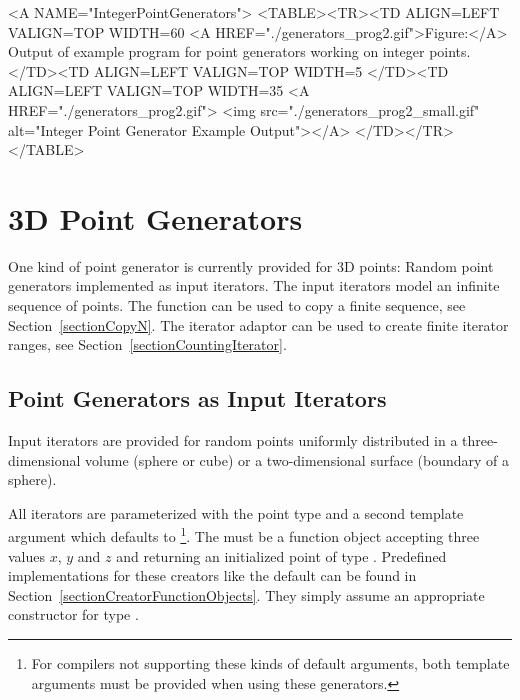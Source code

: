 
\begin{ccHtmlOnly}
  <A NAME="IntegerPointGenerators">
  <TABLE><TR><TD ALIGN=LEFT VALIGN=TOP WIDTH=60%
    <A HREF="./generators_prog2.gif">Figure:</A>
        Output of example program for point generators working
        on integer points.
  </TD><TD ALIGN=LEFT VALIGN=TOP WIDTH=5%
  </TD><TD ALIGN=LEFT VALIGN=TOP WIDTH=35%
    <A HREF="./generators_prog2.gif">
        <img src="./generators_prog2_small.gif" 
             alt="Integer Point Generator Example Output"></A>
  </TD></TR></TABLE>
\end{ccHtmlOnly}%


\newpage
\section{3D Point Generators}
\label{sectionPointGenerators_3}

One kind of point generator is currently provided for 3D points: Random point
generators implemented as input iterators.  The input iterators model
an infinite sequence of points. The function  can
be used to copy a finite sequence, see Section~\ref{sectionCopyN}. The
iterator adaptor  can be used to create
finite iterator ranges, see Section~\ref{sectionCountingIterator}.


\subsection{Point Generators as Input Iterators}

\ccDefinition

Input iterators are provided for random points uniformly distributed
in a three-dimensional volume (sphere or cube) or a two-dimensional
surface (boundary of a sphere).

All iterators are parameterized with the point type  and a second
template argument  which defaults to
\footnote{%
  For compilers not supporting these kinds of default arguments, both
  template arguments must be provided when using these generators.}.
The  must be a function object accepting three
 values $x$, $y$ and $z$ and returning an initialized
point  of type . Predefined implementations for
these creators like the default can be found in
Section~\ref{sectionCreatorFunctionObjects}.  They simply assume an
appropriate constructor for type .

